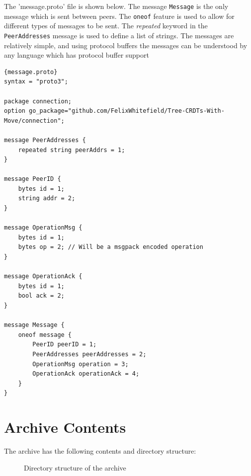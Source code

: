 \documentclass[12pt]{report}
\begin{document}
The 'message.proto' file is shown below. The message \texttt{Message} is the only message which is sent between peers. The \texttt{oneof} feature is used to allow for different types of messages to be sent. The \textit{repeated} keyword in the \texttt{PeerAddresses} message is used to define a list of strings. The messages are relatively simple, and using protocol buffers the messages can be understood by any language which has protocol buffer support 

\begin{lstlisting}[language=protobuf3, style=protobuf]{message.proto}
syntax = "proto3";

package connection;
option go_package="github.com/FelixWhitefield/Tree-CRDTs-With-Move/connection";

message PeerAddresses {
    repeated string peerAddrs = 1;
}

message PeerID {
    bytes id = 1;
    string addr = 2;
}

message OperationMsg {
    bytes id = 1; 
    bytes op = 2; // Will be a msgpack encoded operation
}

message OperationAck {
    bytes id = 1;
    bool ack = 2;
}

message Message {
    oneof message {
        PeerID peerID = 1;
        PeerAddresses peerAddresses = 2;
        OperationMsg operation = 3;
        OperationAck operationAck = 4;
    }
}
\end{lstlisting}

\chapter{Archive Contents}

The archive has the following contents and directory structure:
\begin{figure}[h]
    \caption{Directory structure of the archive}
\end{figure}


\end{document}

